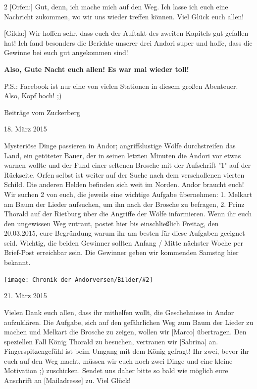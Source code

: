 \documentclass[10pt, a4paper, oneside]{book}
\newcommand{\bildmitts}[2][height=0.32\textwidth,width=0.48\textwidth,keepaspectratio]{%
    \begin{center}
        \texttt{[image: Chronik der Andorversen/Bilder/\#2]}
    \end{center}
}
\begin{document}
\begin{multicols}{2}
[Orfen:] Gut, denn, ich mache mich auf den Weg. Ich lasse ich euch eine Nachricht zukommen, wo wir uns wieder treffen können. Viel Glück euch allen!

[Gilda:] Wir hoffen sehr, dass euch der Auftakt des zweiten Kapitels gut gefallen hat! Ich fand besonders die Berichte unserer drei Andori super und hoffe, dass die Gewinne bei euch gut angekommen sind!

\textbf{Also, Gute Nacht euch allen! Es war mal wieder toll!}

P.S.: Facebook ist nur eine von vielen Stationen in diesem großen Abenteuer. Also, Kopf hoch! ;)


\begin{center}
    Beiträge vom Zuckerberg

    18. März 2015
\end{center}



Mysteriöse Dinge passieren in Andor; angriffslustige Wölfe durchstreifen das Land, ein getöteter Bauer, der in seinen letzten Minuten die Andori vor etwas warnen wollte und der Fund einer seltenen Brosche mit der Aufschrift "1" auf der Rückseite. Orfen selbst ist weiter auf der Suche nach dem verschollenen vierten Schild. Die anderen Helden befinden sich weit im Norden. Andor braucht euch! Wir suchen 2 von euch, die jeweils eine wichtige Aufgabe übernehmen: 1. Melkart am Baum der Lieder aufsuchen, um ihn nach der Brosche zu befragen, 2. Prinz Thorald auf der Rietburg über die Angriffe der Wölfe informieren. Wenn ihr euch den ungewissen Weg zutraut, postet hier bis einschließlich Freitag, den 20.03.2015, eure Begründung warum ihr am besten für diese Aufgaben geeignet seid. Wichtig, die beiden Gewinner sollten Anfang / Mitte nächster Woche per Brief-Post erreichbar sein. Die Gewinner geben wir kommenden Samstag hier bekannt. 

\bildmitts{AA2015 Die rechte Hand des Königs 3.jpeg}

\begin{center}
    21. März 2015
\end{center}

Vielen Dank euch allen, dass ihr mithelfen wollt, die Geschehnisse in Andor aufzuklären. Die Aufgabe, sich auf den gefährlichen Weg zum Baum der Lieder zu machen und Melkart die Brosche zu zeigen, wollen wir [Marco] übertragen. Den speziellen Fall König Thorald zu besuchen, vertrauen wir [Sabrina] an. Fingerspitzengefühl ist beim Umgang mit dem König gefragt! Ihr zwei, bevor ihr euch auf den Weg macht, müssen wir euch noch zwei Dinge und eine kleine Motivation ;) zuschicken. Sendet uns daher bitte so bald wie möglich eure Anschrift an [Mailadresse] zu. Viel Glück!



\end{multicols}
\end{document}
